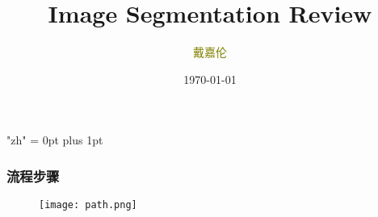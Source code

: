 \documentclass[notheorems,mathserif,table,compress]{beamer}  %
\begin{document}
\XeTeXlinebreaklocale "zh"         %
\XeTeXlinebreakskip = 0pt plus 1pt %
\begin{comment}
\AtBeginSection[]{                              %
  \frame<handout:0>{
    \frametitle{Content}\small
    \tableofcontents[current,currentsubsection]
  }
}
\AtBeginSubsection[]                            %
{
  \frame<handout:0>                             %
  {
    \frametitle{下一节内容}\small
    \tableofcontents[current,currentsubsection] %
  }
}
\end{comment}
\title[]{Image Segmentation Review}
\author[戴嘉伦]{\textcolor{olive}{戴嘉伦}}
\institute[中国海洋大学]{\small\textcolor{violet}{中国海洋大学}}
\date{\today}
\frame{ \titlepage }


\begin{frame}
  \frametitle{流程步骤}
   \begin{figure}[!ht]
   \centering
   \texttt{[image: path.png]}
   \end{figure}
\end{frame}
\end{document}
